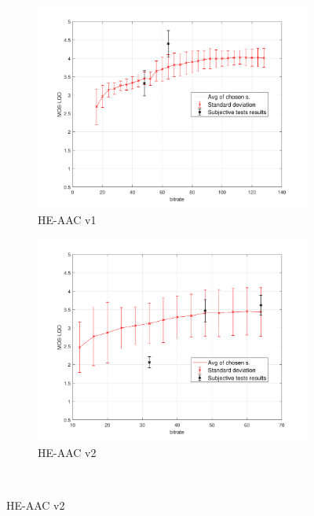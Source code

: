\begin{figure}[H]
    \begin{subfigure}{.5\textwidth}
        \centering
        \includegraphics[width=1\linewidth]{pic/objective/heVisqol.pdf}
        \caption{HE-AAC v1}
        \label{fig:vis:sub3}
    \end{subfigure}%
        \begin{subfigure}{.5\textwidth}
        \centering
        \includegraphics[width=1\linewidth]{pic/objective/hev2Visqol.pdf}
        \caption{HE-AAC v2}
        \label{fig:vis:sub4}
    \end{subfigure}%
    \\
\end{figure}
